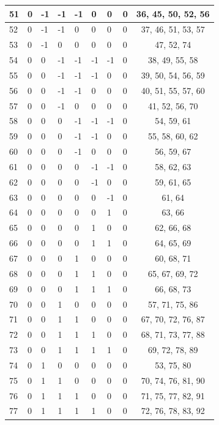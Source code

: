 \begin{longtable}{|l|l|l|l|l|l|l|l|c|}
51 & 0 & -1 & -1 & -1 & 0 & 0 & 0 & 36, 45, 50, 52, 56 \\ \hline
52 & 0 & -1 & -1 & 0 & 0 & 0 & 0 & 37, 46, 51, 53, 57 \\ \hline
53 & 0 & -1 & 0 & 0 & 0 & 0 & 0 & 47, 52, 74 \\ \hline
54 & 0 & 0 & -1 & -1 & -1 & -1 & 0 & 38, 49, 55, 58 \\ \hline
55 & 0 & 0 & -1 & -1 & -1 & 0 & 0 & 39, 50, 54, 56, 59 \\ \hline
56 & 0 & 0 & -1 & -1 & 0 & 0 & 0 & 40, 51, 55, 57, 60 \\ \hline
57 & 0 & 0 & -1 & 0 & 0 & 0 & 0 & 41, 52, 56, 70 \\ \hline
58 & 0 & 0 & 0 & -1 & -1 & -1 & 0 & 54, 59, 61 \\ \hline
59 & 0 & 0 & 0 & -1 & -1 & 0 & 0 & 55, 58, 60, 62 \\ \hline
60 & 0 & 0 & 0 & -1 & 0 & 0 & 0 & 56, 59, 67 \\ \hline
61 & 0 & 0 & 0 & 0 & -1 & -1 & 0 & 58, 62, 63 \\ \hline
62 & 0 & 0 & 0 & 0 & -1 & 0 & 0 & 59, 61, 65 \\ \hline
63 & 0 & 0 & 0 & 0 & 0 & -1 & 0 & 61, 64 \\ \hline
64 & 0 & 0 & 0 & 0 & 0 & 1 & 0 & 63, 66 \\ \hline
65 & 0 & 0 & 0 & 0 & 1 & 0 & 0 & 62, 66, 68 \\ \hline
66 & 0 & 0 & 0 & 0 & 1 & 1 & 0 & 64, 65, 69 \\ \hline
67 & 0 & 0 & 0 & 1 & 0 & 0 & 0 & 60, 68, 71 \\ \hline
68 & 0 & 0 & 0 & 1 & 1 & 0 & 0 & 65, 67, 69, 72 \\ \hline
69 & 0 & 0 & 0 & 1 & 1 & 1 & 0 & 66, 68, 73 \\ \hline
70 & 0 & 0 & 1 & 0 & 0 & 0 & 0 & 57, 71, 75, 86 \\ \hline
71 & 0 & 0 & 1 & 1 & 0 & 0 & 0 & 67, 70, 72, 76, 87 \\ \hline
72 & 0 & 0 & 1 & 1 & 1 & 0 & 0 & 68, 71, 73, 77, 88 \\ \hline
73 & 0 & 0 & 1 & 1 & 1 & 1 & 0 & 69, 72, 78, 89 \\ \hline
74 & 0 & 1 & 0 & 0 & 0 & 0 & 0 & 53, 75, 80 \\ \hline
75 & 0 & 1 & 1 & 0 & 0 & 0 & 0 & 70, 74, 76, 81, 90 \\ \hline
76 & 0 & 1 & 1 & 1 & 0 & 0 & 0 & 71, 75, 77, 82, 91 \\ \hline
77 & 0 & 1 & 1 & 1 & 1 & 0 & 0 & 72, 76, 78, 83, 92 \\ \hline

\end{longtable}
